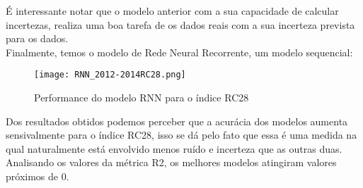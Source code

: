 É interessante notar que o modelo anterior com a sua capacidade de calcular incertezas, realiza uma boa tarefa de  os dados reais com a sua incerteza prevista para os dados. \\ 

Finalmente, temos o modelo de Rede Neural Recorrente, um modelo sequencial:

\begin{figure}[H]
\centering
\texttt{[image: RNN\_2012-2014RC28.png]}
\caption{Performance do modelo RNN para o índice RC28}
\end{figure}


Dos resultados obtidos podemos perceber que a acurácia dos modelos aumenta sensivalmente para o índice RC28, isso se dá pelo fato que essa é uma medida na qual naturalmente está envolvido menos ruído e incerteza que as outras duas. Analisando os valores da métrica R2, os melhores modelos atingiram valores próximos de $0$.

